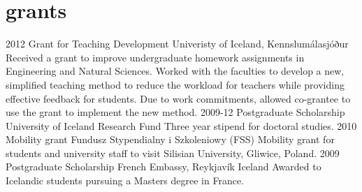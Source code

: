 \section{grants}
\begin{entrylist}
\entry
{2012}
{Grant for Teaching Development}
{Univeristy of Iceland, Kennslumálasjóður}
{Received a grant to improve undergraduate homework assignments in Engineering and Natural Sciences. Worked with the faculties to develop a new, simplified teaching method to reduce the workload for teachers while providing effective feedback for students. Due to work commitments, allowed co-grantee to use the grant to implement the new method.  }
\entry
{2009-12}
{Postgraduate Scholarship}
{University of Iceland Research Fund}
{Three year stipend for doctoral studies.}
\entry
{2010}
{Mobility grant}
{Fundusz Stypendialny i Szkoleniowy (FSS)} 
{Mobility grant for students and university staff to visit Silisian University, Gliwice, Poland.}
\entry
{2009}
{Postgraduate Scholarship}
{French Embassy, Reykjavík Iceland}
{Awarded to Icelandic students pursuing a Masters degree in France.}
\end{entrylist}

